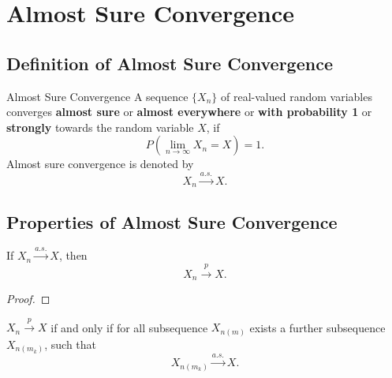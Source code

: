 \section{Almost Sure Convergence}

\subsection{Definition of Almost Sure Convergence}

\begin{definition}{Almost Sure Convergence}{}
    A sequence $\{X_n\}$ of real-valued random variables converges \textbf{almost sure} or \textbf{almost everywhere} or \textbf{with probability 1} or \textbf{strongly} towards the random variable $X$, if
    \begin{equation}
        P\left(\lim_{n\to\infty}X_n=X\right)=1.
    \end{equation}
    Almost sure convergence is denoted by
    \begin{equation}
        X_n \stackrel{a.s.}{\rightarrow} X.
    \end{equation}
\end{definition}

\begin{note}

\end{note}

\subsection{Properties of Almost Sure Convergence}

\begin{theorem}{}{}
    If $X_{n}\stackrel{a.s.}{\rightarrow}X$, then
    \begin{equation}
        X_{n}\stackrel{p}{\rightarrow}X.
    \end{equation}
\end{theorem}

\begin{proof}

\end{proof}

\begin{theorem}{}{}
    $X_n\stackrel{p}{\rightarrow}X$ if and only if for all subsequence $X_{n(m)}$ exists a further subsequence $X_{n(m_k)}$, such that
    \begin{equation}
        X_{n(m_k)}\stackrel{a.s.}{\rightarrow}X.
    \end{equation}
\end{theorem}

